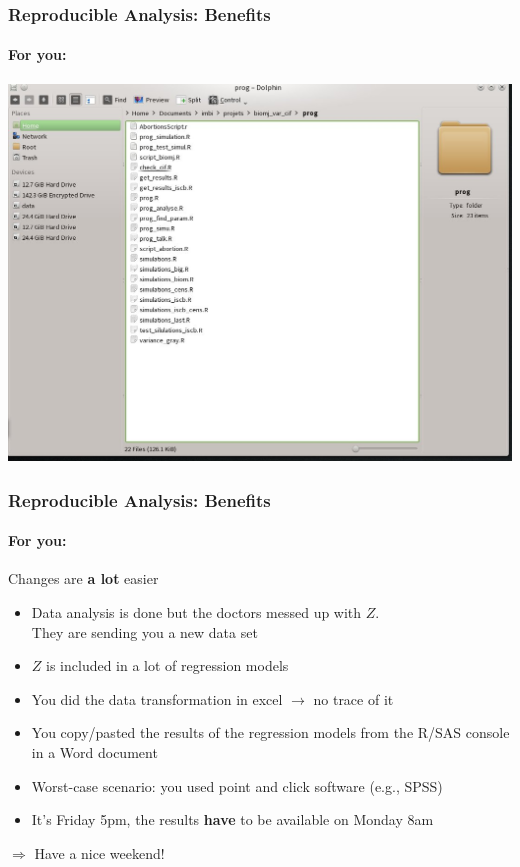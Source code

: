 \documentclass[paper=screen,mathserif]{beamer}\usepackage[]{graphicx}\usepackage[]{color}
\begin{document}
\begin{frame}
  \frametitle{Reproducible Analysis: Benefits}
  \framesubtitle{For you:}
  \begin{center}
    \includegraphics[width = \linewidth]{graphics/folders.jpeg}
  \end{center}
\end{frame}

\begin{frame}
  \frametitle{Reproducible Analysis: Benefits}
  \framesubtitle{For you:}
  Changes are {\bf a lot} easier
  \begin{itemize}
  \item Data analysis is done but the doctors messed up with $Z$.\\
    They are sending you a new data set
  \item $Z$ is included in a lot of regression models
  \item You did the data transformation in excel $\rightarrow$ no
    trace of it
  \item You copy/pasted the results of the regression models from the
    R/SAS console in a Word document
  \item Worst-case scenario: you used point and click software (e.g., SPSS)
  \item It's Friday 5pm, the results {\bf have} to be available on Monday 8am
  \end{itemize}
  $\Rightarrow$ Have a nice weekend!
\end{frame}
\end{document}
